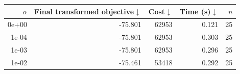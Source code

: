 \begin{tabular}{rrrrr}
\toprule
$\alpha$ & Final transformed objective$\downarrow$ & Cost$\downarrow$ & Time (s)$\downarrow$ & $n$ \\
\midrule
0e+00 & -75.801 & 62953 & 0.121 & 25 \\
1e-04 & -75.801 & 62953 & 0.303 & 25 \\
1e-03 & -75.801 & 62953 & 0.296 & 25 \\
1e-02 & -75.461 & 53418 & 0.292 & 25 \\
\bottomrule
\end{tabular}
